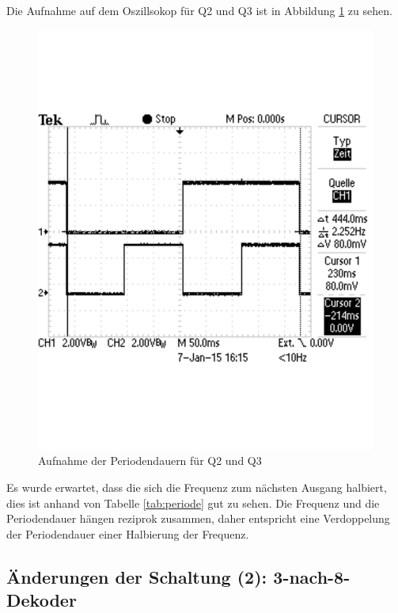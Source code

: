 \documentclass[12pt,a4paper]{article}
\begin{document}
Die Aufnahme auf dem Oszillsokop für Q2 und Q3 ist in Abbildung \ref{fig:periode_2} zu sehen.

\begin{figure}[H] 
  \centering 	
    \includegraphics[trim = 0mm 50mm 0mm 50mm, clip, scale = 0.4]{TEK0013.pdf}
  	\caption[Aufnahme der Periodendauern für Q2 und Q3]{Aufnahme der Periodendauern für Q2 und Q3}
  \label{fig:periode_2}
\end{figure}

Es wurde erwartet, dass die sich die Frequenz zum nächsten Ausgang halbiert, dies ist anhand von Tabelle \ref{tab:periode} gut zu sehen. Die Frequenz und die Periodendauer hängen reziprok zusammen, daher entspricht eine Verdoppelung der Periodendauer einer Halbierung der Frequenz.

\subsection{Änderungen der Schaltung (2): 3-nach-8-Dekoder}
\end{document}
